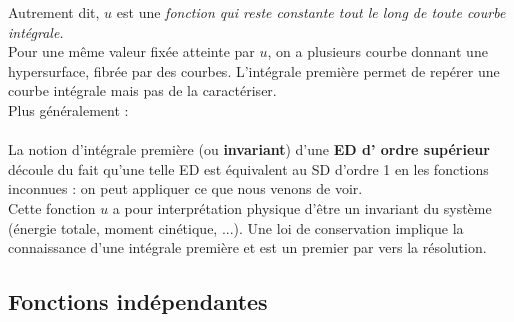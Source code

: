 	Autrement dit, $u$ est une \textit{fonction qui reste constante tout le long 
	de toute courbe intégrale.}\\
	Pour une même valeur fixée atteinte par $u$, on a plusieurs courbe donnant 
	une hypersurface, fibrée par des courbes. L'intégrale première permet de 
	repérer une courbe intégrale mais pas de la caractériser.\\
	
	Plus généralement :\\
	\ \\
	
	La notion d'intégrale première (ou \textbf{invariant}) d'une \textbf{ED d'
	ordre supérieur} découle du fait qu'une telle ED est équivalent au SD d'ordre 
	1 en les fonctions inconnues : on peut appliquer ce que nous venons de voir.\\

	Cette fonction $u$ a pour interprétation physique d'être un invariant du 
	système (énergie totale, moment cinétique, ...). Une loi de conservation 
	implique la connaissance d'une intégrale première et est un premier par 
	vers la résolution.
	
	\setcounter{subsection}{5}
	\subsection{Fonctions indépendantes}
	\ \\
	
	
